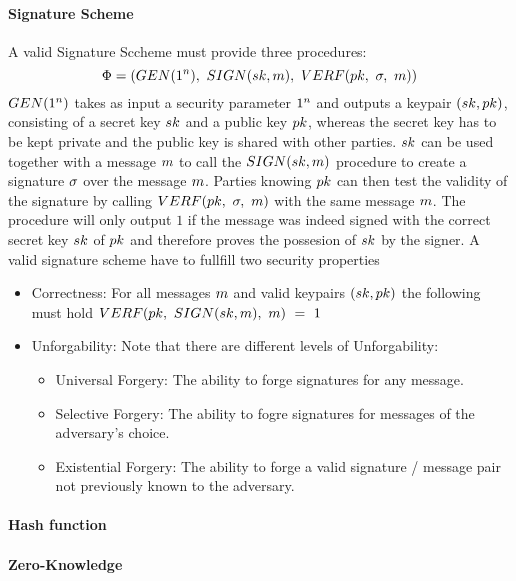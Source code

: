 \paragraph{Signature Scheme}
A valid Signature Sccheme must provide three procedures:
\[ \Phi = (GEN(1^n) ,~ SIGN(sk, m) ,~ VERF(pk ,~ \sigma ,~ m)) \]
$GEN(1^n)$ takes as input a security parameter $1^n$ and outputs a keypair $(sk, pk)$, consisting of a secret key $sk$ and a public key $pk$, whereas
the secret key has to be kept private and the public key is shared with other parties.
$sk$ can be used together with a message $m$ to call the $SIGN(sk, m)$ procedure to create a signature $\sigma$ over the message $m$.
Parties knowing $pk$ can then test the validity of the signature by calling $VERF(pk ,~ \sigma ,~ m)$ with the same message $m$. The procedure will only output $1$ if the message was
indeed signed with the correct secret key $sk$ of $pk$ and therefore proves the possesion of $sk$ by the signer.
A valid signature scheme have to fullfill two security properties
\begin{itemize}
    \item Correctness: For all messages $m$ and valid keypairs $(sk, pk)$ the following must hold $VERF(pk ,~ SIGN(sk, m) ,~ m) ~=~ 1$
    \item Unforgability: Note that there are different levels of Unforgability:~\cite{goldwasser1988digital}
    \begin{itemize}
        \item Universal Forgery: The ability to forge signatures for any message.
        \item Selective Forgery: The ability to fogre signatures for messages of the adversary's choice.
        \item Existential Forgery: The ability to forge a valid signature / message pair not previously known to the adversary.
    \end{itemize}
\end{itemize}

\paragraph{Hash function}

\paragraph{Zero-Knowledge}

